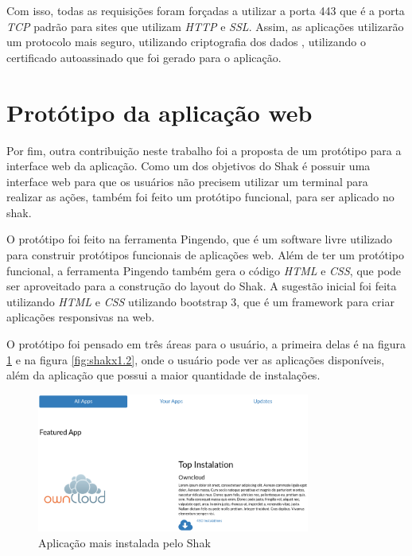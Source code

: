 Com isso, todas as requisições foram forçadas a utilizar a porta 443 que é a porta
\textit{TCP} padrão para sites que utilizam \textit{HTTP} e \textit{SSL}. Assim, 
as aplicações utilizarão um protocolo mais seguro, utilizando criptografia dos dados
, utilizando o certificado autoassinado que foi gerado para o aplicação.

\section{Protótipo da aplicação web}
\label{sub:prototipo}

Por fim, outra contribuição neste trabalho foi a proposta de um protótipo para a interface
web da aplicação. Como um dos objetivos do Shak é possuir uma interface web para que
os usuários não precisem utilizar um terminal para realizar as ações, também foi
feito um protótipo funcional, para ser aplicado no shak. 

O protótipo foi feito
na ferramenta Pingendo, que é um software livre utilizado para construir
protótipos funcionais de aplicações web. Além de ter um protótipo funcional, a 
ferramenta Pingendo
também gera o código \textit{HTML} e \textit{CSS}, que pode ser aproveitado para 
a construção do layout do Shak. A sugestão inicial foi feita utilizando \textit{HTML} e \textit{CSS} utilizando bootstrap 3, que é um framework para criar aplicações responsivas 
na web. 

O protótipo foi pensado em três áreas para o usuário, a primeira delas é na figura
\ref{fig:shakx1} e na figura \ref{fig:shakx1.2}, onde
o usuário pode ver as aplicações disponíveis, além da aplicação que possui a maior
quantidade de instalações.

\begin{figure}[H]
  \centering
  \includegraphics[width=0.8\textwidth]
      {figuras/shak1}
      \caption{Aplicação mais instalada pelo Shak}
  \label{fig:shakx1}
\end{figure}


